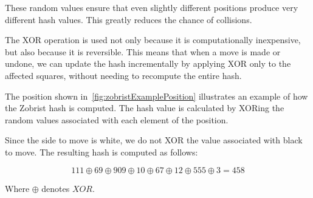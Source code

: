 \noindent These random values ensure that even slightly different positions produce very different hash values. This greatly reduces the chance of collisions.

\vspace{1em}

\noindent The XOR operation is used not only because it is computationally inexpensive, but also because it is reversible. This means that when a move is made or undone, we can update the hash incrementally by applying XOR only to the affected squares, without needing to recompute the entire hash.

\vspace{1em}

\noindent The position shown in~\cref{fig:zobristExamplePosition} illustrates an example of how the Zobrist hash is computed.  
The hash value is calculated by XORing the random values associated with each element of the position.

\vspace{1em}

\noindent Since the side to move is white, we do not XOR the value associated with black to move. The resulting hash is computed as follows:

\[
111 \oplus 69 \oplus 909 \oplus 10 \oplus 67 \oplus 12 \oplus 555 \oplus 3 = 458
\]

\noindent Where $\oplus$ denotes $XOR$.

